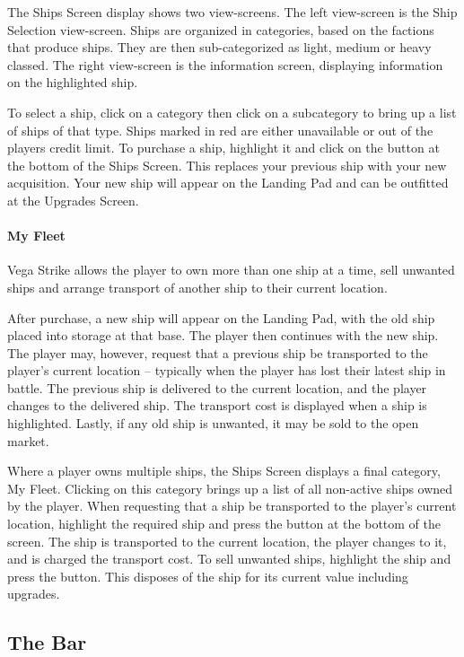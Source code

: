 \documentclass{article}
\newcommand{\key}[1]{%
  \tikz[baseline=(key.base)]{
    \node[draw=gray!50, fill=gray!5, rounded corners=2pt, inner sep=2pt, minimum height=1.5ex] (key) {\footnotesize\sffamily\bfseries #1};
  }%
}
\begin{document}
The Ships Screen display shows two view-screens. The left view-screen is the Ship Selection view-screen. Ships are organized in categories, based on the factions that produce ships. They are then sub-categorized as light, medium or heavy classed. The right view-screen is the information screen, displaying information on the highlighted ship. 


To select a ship, click on a category then click on a subcategory to bring up a list of ships of that type. Ships marked in red are either unavailable or out of the players credit limit. To purchase a ship, highlight it and click on the \key{Buy} button at the bottom of the Ships Screen. This replaces your previous ship with your new acquisition. Your new ship will appear on the Landing Pad and can be outfitted at the Upgrades Screen. 


\paragraph{My Fleet }

Vega Strike allows the player to own more than one ship at a time, sell unwanted ships and arrange transport of another ship to their current location. 

After purchase, a new ship will appear on the Landing Pad, with the old ship placed into storage at that base. The player then continues with the new ship. The player may, however, request that a previous ship be transported to the player's current location -- typically when the player has lost their latest ship in battle. The previous ship is delivered to the current location, and the player changes to the delivered ship. The transport cost is displayed when a ship is highlighted. Lastly, if any old ship is unwanted, it may be sold to the open market. 

Where a player owns multiple ships, the Ships Screen displays a final category, My Fleet. Clicking on this category brings up a list of all non-active ships owned by the player. When requesting that a ship be transported to the player's current location, highlight the required ship and press the \key{Buy} button at the bottom of the screen. The ship is transported to the current location, the player changes to it, and is charged the transport cost. To sell unwanted ships, highlight the ship and press the \key{Sell} button. This disposes of the ship for its current value including upgrades. 


\subsection{ The Bar } \label{sec:bar}
\end{document}
